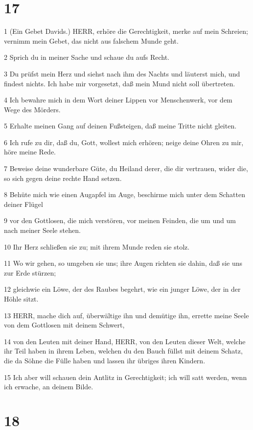 \chapter{17}

\par 1 (Ein Gebet Davids.) HERR, erhöre die Gerechtigkeit, merke auf mein Schreien; vernimm mein Gebet, das nicht aus falschem Munde geht.
\par 2 Sprich du in meiner Sache und schaue du aufs Recht.
\par 3 Du prüfst mein Herz und siehst nach ihm des Nachts und läuterst mich, und findest nichts. Ich habe mir vorgesetzt, daß mein Mund nicht soll übertreten.
\par 4 Ich bewahre mich in dem Wort deiner Lippen vor Menschenwerk, vor dem Wege des Mörders.
\par 5 Erhalte meinen Gang auf deinen Fußsteigen, daß meine Tritte nicht gleiten.
\par 6 Ich rufe zu dir, daß du, Gott, wollest mich erhören; neige deine Ohren zu mir, höre meine Rede.
\par 7 Beweise deine wunderbare Güte, du Heiland derer, die dir vertrauen, wider die, so sich gegen deine rechte Hand setzen.
\par 8 Behüte mich wie einen Augapfel im Auge, beschirme mich unter dem Schatten deiner Flügel
\par 9 vor den Gottlosen, die mich verstören, vor meinen Feinden, die um und um nach meiner Seele stehen.
\par 10 Ihr Herz schließen sie zu; mit ihrem Munde reden sie stolz.
\par 11 Wo wir gehen, so umgeben sie uns; ihre Augen richten sie dahin, daß sie uns zur Erde stürzen;
\par 12 gleichwie ein Löwe, der des Raubes begehrt, wie ein junger Löwe, der in der Höhle sitzt.
\par 13 HERR, mache dich auf, überwältige ihn und demütige ihn, errette meine Seele von dem Gottlosen mit deinem Schwert,
\par 14 von den Leuten mit deiner Hand, HERR, von den Leuten dieser Welt, welche ihr Teil haben in ihrem Leben, welchen du den Bauch füllst mit deinem Schatz, die da Söhne die Fülle haben und lassen ihr übriges ihren Kindern.
\par 15 Ich aber will schauen dein Antlitz in Gerechtigkeit; ich will satt werden, wenn ich erwache, an deinem Bilde.

\chapter{18}

